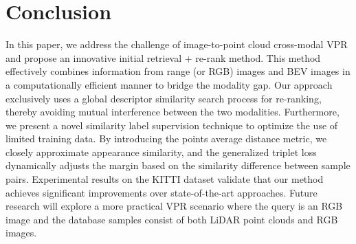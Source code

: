 \section{Conclusion}
In this paper, we address the challenge of image-to-point cloud cross-modal VPR and propose an innovative initial retrieval + re-rank method. This method effectively combines information from range (or RGB) images and BEV images in a computationally efficient manner to bridge the modality gap. Our approach exclusively uses a global descriptor similarity search process for re-ranking, thereby avoiding mutual interference between the two modalities.
Furthermore, we present a novel similarity label supervision technique to optimize the use of limited training data. By introducing the points average distance metric, we closely approximate appearance similarity, and the generalized triplet loss dynamically adjusts the margin based on the similarity difference between sample pairs.
Experimental results on the KITTI dataset validate that our method achieves significant improvements over state-of-the-art approaches. Future research will explore a more practical VPR scenario where the query is an RGB image and the database samples consist of both LiDAR point clouds and RGB images. 
